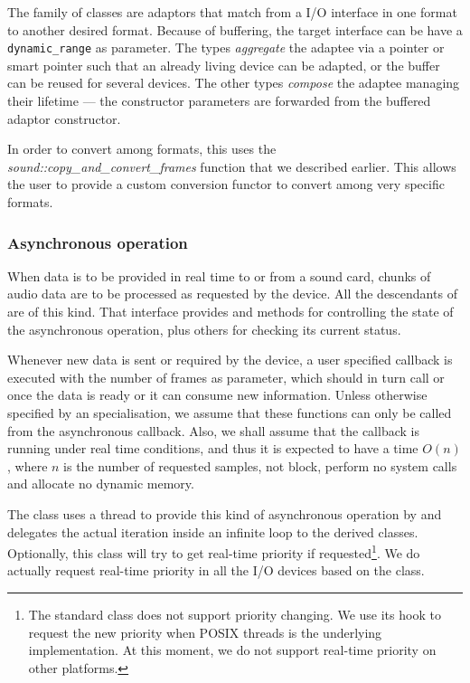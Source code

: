 The  family of classes are adaptors that match from
a I/O interface in one format to another desired format. Because of
buffering, the target interface can be have a \texttt{dynamic\_range}
as parameter. The  types \emph{aggregate}
the adaptee via a pointer or smart pointer such that an already living
device can be adapted, or the buffer can be reused for several
devices. The other types \emph{compose} the adaptee managing their
lifetime --- the constructor parameters are forwarded from the
buffered adaptor constructor.

In order to convert among formats, this uses the
\emph{sound::co\-py\_and\_con\-vert\_fra\-mes} function that we
described earlier. This allows the user to provide a custom conversion
functor to convert among very specific formats.

\subsubsection{Asynchronous operation}
\label{sec:asyncio}

When data is to be provided in real time to or from a sound card,
chunks of audio data are to be processed as requested by the
device. All the descendants of  are of this
kind. That interface provides  and 
methods for controlling the state of the asynchronous
operation, plus others for checking its current status.

Whenever new data is sent or required by the device, a user specified
callback is executed with the number of frames as parameter, which
should in turn call  or  once the data is
ready or it can consume new information. Unless otherwise specified by
an specialisation, we assume that these functions can only be called
from the asynchronous callback. Also, we shall assume that the
callback is running under real time conditions, and thus it is
expected to have a time $O(n)$, where $n$ is the number of requested
samples, not block, perform no system calls and allocate no dynamic
memory.

The  class uses a thread to provide this kind of
asynchronous operation by and delegates the actual iteration inside an
infinite loop to the derived classes. Optionally, this class will try
to get real-time priority if requested\footnote{The 
  standard class does not support priority changing. We use its
   hook to request the new priority when POSIX
  threads is the underlying implementation. At this moment, we do not
  support real-time priority on other platforms.}. We do actually
request real-time priority in all the I/O devices based on the
 class.


